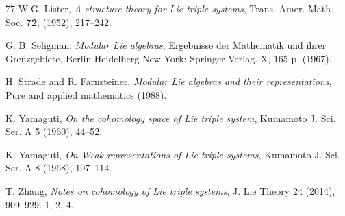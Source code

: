 \documentclass[11pt, twoside]{article}
\begin{document}
\begin{thebibliography}{77}
        W.G. Lister,
        \emph{A structure theory for Lie triple systems}, Trans. Amer. Math. Soc. {\bf 72}, (1952), 217--242.

        G. B. Seligman,
        \emph{Modular Lie algebras}, Ergebnisse der Mathematik und ihrer Grenzgebiete, Berlin-Heidelberg-New York: Springer-Verlag. X, 165 p. (1967). 

        H. Strade and R. Farnsteiner,
        \emph{Modular Lie algebras and their representations}, Pure and applied mathematics (1988).

        K. Yamaguti,
        \emph{On the cohomology space of Lie triple system}, Kumamoto J. Sci. Ser. A 5 (1960), 44--52. 

        K. Yamaguti,
        \emph{On Weak representations of Lie triple systems}, Kumamoto J. Sci. Ser. A 8 (1968), 107--114. 

        T. Zhang,
        \emph{Notes on cohomology of Lie triple systems}, J. Lie Theory 24 (2014), 909--929. 1, 2, 4.

     

       

       
\end{thebibliography}
\end{document}
